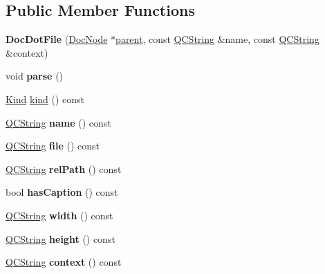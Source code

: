 \subsection*{Public Member Functions}
\begin{DoxyCompactItemize}
\item 
\mbox{\label{class_doc_dot_file_a7666f3059947cfb94d1f71c85016636b}} 
{\bfseries Doc\+Dot\+File} (\mbox{\hyperlink{class_doc_node}{Doc\+Node}} $\ast$\mbox{\hyperlink{class_doc_node_a73e8ad29a91cfceb0968eb00db71a23d}{parent}}, const \mbox{\hyperlink{class_q_c_string}{Q\+C\+String}} \&name, const \mbox{\hyperlink{class_q_c_string}{Q\+C\+String}} \&context)
\item 
\mbox{\label{class_doc_dot_file_aff5e6af68571c92f73e0a5b07f900cb3}} 
void {\bfseries parse} ()
\item 
\mbox{\hyperlink{class_doc_node_aebd16e89ca590d84cbd40543ea5faadb}{Kind}} \mbox{\hyperlink{class_doc_dot_file_ab1d7da6a204174a378805a701641eee4}{kind}} () const
\item 
\mbox{\label{class_doc_dot_file_ac3aac8e4df5b8878718ebc7ba0eadd0c}} 
\mbox{\hyperlink{class_q_c_string}{Q\+C\+String}} {\bfseries name} () const
\item 
\mbox{\label{class_doc_dot_file_a464cffdd353ab0263d9983d91e5ea39a}} 
\mbox{\hyperlink{class_q_c_string}{Q\+C\+String}} {\bfseries file} () const
\item 
\mbox{\label{class_doc_dot_file_a8f2007eb289714be6eda5c91e782309d}} 
\mbox{\hyperlink{class_q_c_string}{Q\+C\+String}} {\bfseries rel\+Path} () const
\item 
\mbox{\label{class_doc_dot_file_a3b90f4992ca7068b4ca29c90e338bcd8}} 
bool {\bfseries has\+Caption} () const
\item 
\mbox{\label{class_doc_dot_file_afba513a7856b01d66b8cda5a6ab7654e}} 
\mbox{\hyperlink{class_q_c_string}{Q\+C\+String}} {\bfseries width} () const
\item 
\mbox{\label{class_doc_dot_file_ad9c8448f8ff1bfd01cf57652c6af2f0d}} 
\mbox{\hyperlink{class_q_c_string}{Q\+C\+String}} {\bfseries height} () const
\item 
\mbox{\label{class_doc_dot_file_af3dba777ffb81132a7efe540e4f48175}} 
\mbox{\hyperlink{class_q_c_string}{Q\+C\+String}} {\bfseries context} () const
\end{DoxyCompactItemize}
